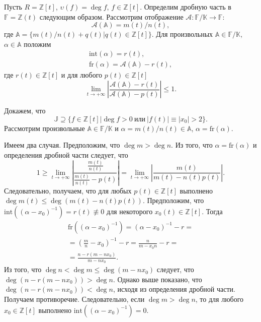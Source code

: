 \documentclass[_00_autoref.tex]{subfiles}
\begin{document}
\begin{example}\label{example:Z[t]}
    Пусть $R = \mathbb{Z}[t]$, $\upsilon(f)=\deg f$, $f \in \mathbb{Z}[t]$.
    Определим дробную часть в $\mathbb{F}=\mathbb{Z}(t)$ следующим образом.
    Рассмотрим отображение $\mathcal{A}:\mathbb{F}/\mathbb{K}\to\mathbb{F}$:
    \begin{equation*}
        \mathcal{A}(\mathbb{A})=m(t)/n(t),
    \end{equation*}
    где $\mathbb{A}=\{m(t)/n(t)+q(t)|q(t)\in\mathbb{Z}[t]\}.$
    Для произвольных $\mathbb{A}\in\mathbb{F}/\mathbb{K},$ $\alpha\in\mathbb{A}$ положим
    \begin{equation*}
        \begin{array}{c}
            \textrm{int}(\alpha)=r(t),\\
            \textrm{fr}(\alpha)=\mathcal{A}(\mathbb{A})-r(t),
        \end{array}
    \end{equation*}
    где $r(t)\in\mathbb{Z}[t]$ и для любого $p(t)\in\mathbb{Z}[t]$
    \begin{equation*}
        \lim_{t\to+\infty}\left|\frac{\mathcal{A}(\mathbb{A})-r(t)}{\mathcal{A}(\mathbb{A})-p(t)}\right|\le 1.
    \end{equation*}

    Докажем, что
    \begin{equation*}
        \mathbb{J}\supseteq\{f\in\mathbb{Z}[t]|\deg f>0\ \textrm{или}\ |f(t)|\equiv|x_{0}|>2\}.
    \end{equation*}
    Рассмотрим произвольные $\mathbb{A}\in\mathbb{F}/\mathbb{K}$ и $\alpha=m(t)/n(t)\in\mathbb{A}$, $\alpha=\textrm{fr}(\alpha)$.

    Имеем два случая.
    Предположим, что $\deg m > \deg n$.
    Из того, что $\alpha=\textrm{fr}(\alpha)$ и определения дробной части следует, что
    \begin{equation*}
        1 \ge \lim_{t\to+\infty}\left|\frac{\frac{m(t)}{n(t)}}{\frac{m(t)}{n(t)} - p(t)}\right| = \lim_{t\to+\infty}\left|\frac{m(t)}{m(t) - n(t)p(t)}\right|.
    \end{equation*}
    Следовательно, получаем, что для любых $p(t)\in \mathbb{Z}[t]$ выполнено $\deg m(t) \le \deg(m(t) - n(t)p(t))$.
    Предположим, что $\textrm{int}((\alpha-x_{0})^{-1})=r(t)\not\equiv0$ для некоторого $x_{0}(t)\in\mathbb{Z}[t]$.
    Тогда
    \begin{equation*}
        \begin{split}
            \textrm{fr}((\alpha - x_{0})^{-1}) = (\alpha - x_0)^{-1} - r =\\
            = \left(\frac{m}{n} - x_0\right)^{-1} - r = \frac{n}{m - x_0 n} - r =\\
            = \frac{n - r(m - nx_{0})}{m - nx_{0}}.
        \end{split}
    \end{equation*}
    Из того, что $\deg n < \deg m\le \deg(m-nx_{0})$ следует, что $\deg(n-r(m-nx_{0})) > \deg n$.
    Однако выше показано, что $\deg(n-r(m-nx_{0})) < \deg n$, исходя из определения дробной части.
    Получаем противоречие.
    Следовательно, если $\deg m > \deg n$, то для любого $x_0 \in \mathbb{Z}[t]$ выполнено $\textrm{int}((\alpha-x_{0})^{-1}) = 0$.


\end{example}
\end{document}
